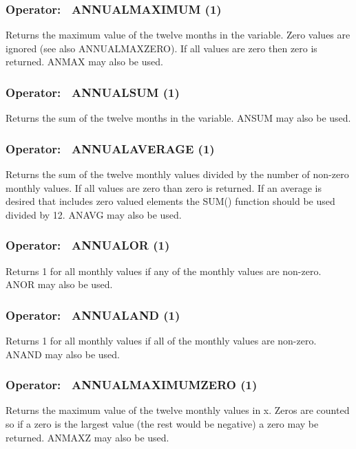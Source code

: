 \subsubsection{Operator:~ ANNUALMAXIMUM (1)}\label{operator-annualmaximum-1}

Returns the maximum value of the twelve months in the variable. Zero values are ignored (see also ANNUALMAXZERO). If all values are zero then zero is returned. ANMAX may also be used.

\subsubsection{Operator:~ ANNUALSUM (1)}\label{operator-annualsum-1}

Returns the sum of the twelve months in the variable. ANSUM may also be used.

\subsubsection{Operator:~ ANNUALAVERAGE (1)}\label{operator-annualaverage-1}

Returns the sum of the twelve monthly values divided by the number of non-zero monthly values. If all values are zero than zero is returned. If an average is desired that includes zero valued elements the SUM() function should be used divided by 12. ANAVG may also be used.

\subsubsection{Operator:~ ANNUALOR (1)}\label{operator-annualor-1}

Returns 1 for all monthly values if any of the monthly values are non-zero. ANOR may also be used.

\subsubsection{Operator:~ ANNUALAND (1)}\label{operator-annualand-1}

Returns 1 for all monthly values if all of the monthly values are non-zero. ANAND may also be used.

\subsubsection{Operator:~ ANNUALMAXIMUMZERO (1)}\label{operator-annualmaximumzero-1}

Returns the maximum value of the twelve monthly values in x. Zeros are counted so if a zero is the largest value (the rest would be negative) a zero may be returned. ANMAXZ may also be used.

